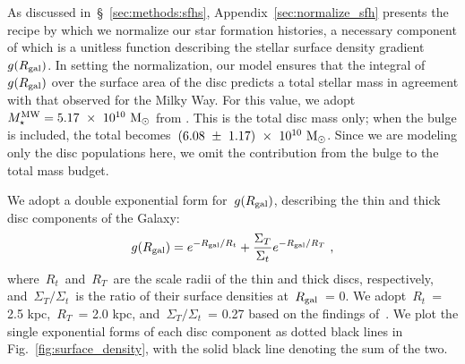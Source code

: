 \documentclass[draft2.tex]{subfiles}
\begin{document}
As discussed in~\S~\ref{sec:methods:sfhs}, Appendix~\ref{sec:normalize_sfh} 
presents the recipe by which we normalize our star formation histories, a 
necessary component of which is a unitless function describing the stellar 
surface density gradient~$g(R_\text{gal})$. 
In setting the normalization, our model ensures that the integral of~$g(R_\text{gal})$ 
over the surface area of the disc predicts a total stellar mass in agreement 
with that observed for the Milky Way. 
For this value, we adopt~$M_\star^\text{MW} = 5.17~\times~10^{10}~\text{M}_\odot$ from 
\citet[][$\pm 1.11\times10^{10}~\msun$]{Licquia2015}. 
This is the total disc mass only; when the bulge is included, the total 
becomes~$(6.08~\pm~1.17)~\times~10^{10}~\text{M}_\odot$. 
Since we are modeling only the disc populations here, we omit the contribution 
from the bulge to the total mass budget. 
\par 
We adopt a double exponential form for~$g(R_\text{gal})$, describing the thin and 
thick disc components of the Galaxy: 
\begin{equation} 
g(R_\text{gal}) = e^{-R_\text{gal}/R_t} + \frac{\Sigma_T}{\Sigma_t} 
e^{-R_\text{gal}/R_T}~, 
\label{eq:gradient} 
\end{equation} 
where~$R_t$~and~$R_T$~are the scale radii of the thin and thick discs, 
respectively, and~$\Sigma_T/\Sigma_t$~is the ratio of their surface densities 
at~$R_\text{gal}$~= 0. 
We adopt~$R_t$~= 2.5 kpc,~$R_T$~= 2.0 kpc, and~$\Sigma_T/\Sigma_t$~= 0.27 based 
on the findings of~\citet{Bland-Hawthorn2016}. 
We plot the single exponential forms of each disc component as dotted black 
lines in Fig.~\ref{fig:surface_density}, with the solid black line denoting the 
sum of the two. 
\end{document}
